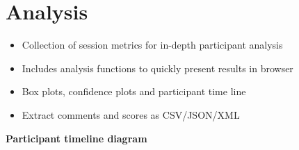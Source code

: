 \vspace{-0.8cm}

{\color{emphasisered} \section{Analysis}}


\normalsize

\begin{itemize}%
	\item Collection of session metrics for in-depth participant analysis
	\item Includes analysis functions to quickly present results in browser
	\item Box plots, confidence plots and participant time line
	\item Extract comments and scores as CSV/JSON/XML
\end{itemize}
\vspace{-1cm}

\begin{center}
\small
\textbf{Participant timeline diagram}
\end{center}

\vspace{-0.3cm}
